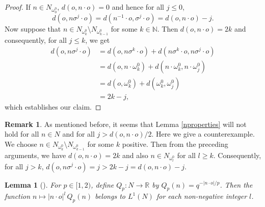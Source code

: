 \documentclass[12pt,reqno]{amsart}
\newtheorem{lemma}[theorem]{Lemma}
\theoremstyle{definition}
\theoremstyle{definition}
\newtheorem{remark}[theorem]{Remark}
\numberwithin{equation}{section}
\begin{document}
\begin{proof}
 If $n\in N_{\omega^{0}_{0}}$, $d(o,n\cdot o)=0$ and hence for all $j\leq 0$,
$$d(o,n\sigma^{j}\cdot o)=d(n^{-1}\cdot o,\sigma^{j}\cdot o)=d(o,n\cdot o)-j.$$
Now suppose that $n\in N_{\omega^{0}_{k}}\setminus N_{\omega^{0}_{k-1}}$ for some $k\in\mathbb{N}$. Then $d(o,n\cdot o)=2k$ and consequently, for all $j\leq k$, we get
\begin{align*}
d(o,n\sigma^{j}\cdot o)&=d(o,n\sigma^{k}\cdot o)+d(n\sigma^{k}\cdot o,n\sigma^{j}\cdot o)\\
&=d(o,n\cdot \omega^{0}_{k})+d(n\cdot \omega^{0}_{k},n\cdot \omega^{0}_{j})\\
&=d(o,\omega^{0}_{k})+d(\omega^{0}_{k},\omega^{0}_{j})\\
&=2k-j,
\end{align*}
which establishes our claim.
\end{proof}

\begin{remark}
As mentioned before, it seems that Lemma \ref{nproperties} will not hold for all $n\in N$ and for all $j>d(o,n\cdot o)/2$. Here we give a counterexample.  We choose $n\in N_{\omega^{0}_{k}}\setminus N_{\omega^{0}_{k-1}}$ for some $k$ positive. Then from the preceding arguments, we have $d(o,n\cdot o)=2k$ and also $n\in N_{\omega^{0}_{l}}$ for all $l\geq k$. Consequently, for all $j>k$, $d(o,n\sigma^{j}\cdot o)=j>2k-j=d(o,n\cdot o)-j$.
\end{remark}

\begin{lemma}[{{\cite[Lemma 2.3]{Meda_Stefano_2019}}}]\label{qpn}
For $p\in[1,2)$, define $Q_{p}:N\rightarrow\mathbb{R}$ by $Q_{p}(n)=q^{-|n\cdot o|/p}$. Then the function $n\mapsto |n\cdot o|^{l}\,Q_{p}(n)$ belongs to $L^{1}(N)$ for each non-negative integer $l$.
\end{lemma}
\end{document}
